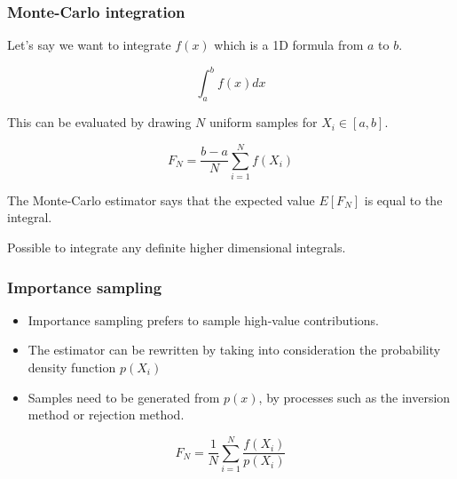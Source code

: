 \documentclass{beamer}
\begin{document}
  \begin{frame}
    \frametitle{Monte-Carlo integration}
    
    Let's say we want to integrate $f(x)$ which is a  1D formula from $a$ to $b$.
    
    \begin{equation}
    \int_a^b f(x) dx
    \end{equation}
    
	This can be evaluated by drawing $N$ uniform samples for $X_i \in [a, b]$.
    
    \begin{equation}
    F_N = \frac{b-a}{N} \sum^N_{i=1} f(X_i)
    \end{equation}
    
    The Monte-Carlo estimator says that the expected value $E[F_N]$ is equal to the integral.
    
    Possible to integrate any definite higher dimensional integrals.
    
  \end{frame}
  
  \begin{frame}
    \frametitle{Importance sampling}
    
    \begin{itemize}
    \item Importance sampling prefers to sample high-value contributions.
    
    \item The estimator can be rewritten by taking into consideration the probability density function $p(X_i)$
    
    \item Samples need to be generated from $p(x)$, by processes such as the inversion method or rejection method.
    
    \end{itemize}
    
     \begin{equation}
    F_N = \frac{1}{N} \sum^N_{i=1} \frac{f(X_i)}{p(X_i)}
    \end{equation}
    
  \end{frame}
  
\end{document}

